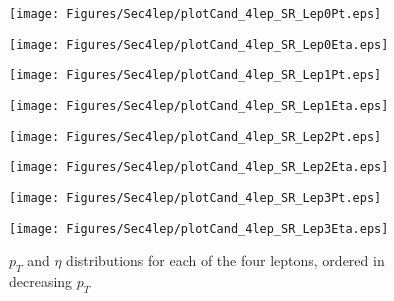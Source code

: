 \begin{figure}[!htbp]
  \begin{minipage}[h]{0.5\textwidth}
    \centering \texttt{[image: Figures/Sec4lep/plotCand\_4lep\_SR\_Lep0Pt.eps]}
  \end{minipage}\hfill
  \begin{minipage}[h]{0.5\textwidth}
    \centering \texttt{[image: Figures/Sec4lep/plotCand\_4lep\_SR\_Lep0Eta.eps]}
  \end{minipage}\hfill
  \begin{minipage}[h]{0.5\textwidth}
    \centering \texttt{[image: Figures/Sec4lep/plotCand\_4lep\_SR\_Lep1Pt.eps]}
  \end{minipage}\hfill
  \begin{minipage}[h]{0.5\textwidth}
    \centering \texttt{[image: Figures/Sec4lep/plotCand\_4lep\_SR\_Lep1Eta.eps]}
  \end{minipage}\hfill
 \begin{minipage}[h]{0.5\textwidth}
    \centering \texttt{[image: Figures/Sec4lep/plotCand\_4lep\_SR\_Lep2Pt.eps]}
  \end{minipage}\hfill
  \begin{minipage}[h]{0.5\textwidth}
    \centering \texttt{[image: Figures/Sec4lep/plotCand\_4lep\_SR\_Lep2Eta.eps]}
  \end{minipage}\hfill
 \begin{minipage}[h]{0.5\textwidth}
    \centering \texttt{[image: Figures/Sec4lep/plotCand\_4lep\_SR\_Lep3Pt.eps]}
  \end{minipage}\hfill
  \begin{minipage}[h]{0.5\textwidth}
    \centering \texttt{[image: Figures/Sec4lep/plotCand\_4lep\_SR\_Lep3Eta.eps]}
  \end{minipage}\hfill
  \caption{ $p_T$ and $\eta$ distributions for each of the four leptons, ordered in decreasing $p_T$ }
  \label{fig:4lSR_leppts}
\end{figure}

